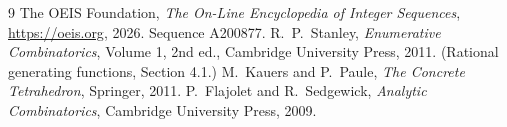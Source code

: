 \documentclass[11pt,a4paper]{article}
\theoremstyle{plain}
\theoremstyle{definition}
\begin{document}
\begin{thebibliography}{9}
 The OEIS Foundation, \emph{The On-Line Encyclopedia of Integer
Sequences}, \url{https://oeis.org}, 2026. Sequence A200877.
 R.~P.~Stanley, \emph{Enumerative Combinatorics}, Volume 1, 2nd ed.,
Cambridge University Press, 2011. (Rational generating functions, Section 4.1.)
 M.~Kauers and P.~Paule, \emph{The Concrete Tetrahedron}, Springer, 2011.
 P.~Flajolet and R.~Sedgewick, \emph{Analytic Combinatorics}, Cambridge
University Press, 2009.
\end{thebibliography}
\end{document}
